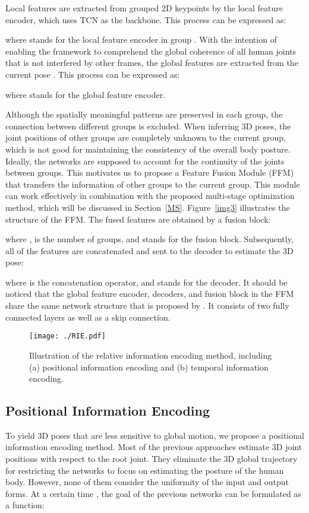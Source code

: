 \documentclass[sigconf]{acmart}
\begin{document}
Local features are extracted from grouped 2D keypoints by the local feature encoder, which uses TCN \cite{jllo20193d} as the backbone. This process can be expressed as:

where  stands for the local feature encoder in group . With the intention of enabling the framework to comprehend the global coherence of all human joints that is not interfered by other frames, the global features are extracted from the current pose . This process can be expressed as:

where  stands for the global feature encoder.

Although the spatially meaningful patterns are preserved in each group, the connection between different groups is excluded. When inferring 3D poses, the joint positions of other groups are completely unknown to the current group, which is not good for maintaining the consistency of the overall body posture. Ideally, the networks are supposed to account for the continuity of the joints between groups. This motivates us to propose a Feature Fusion Module (FFM) that transfers the information of other groups to the current group. This module can work effectively in combination with the proposed multi-stage optimization method, which will be discussed in Section~\ref{MS}. Figure~\ref{img3} illustrates the structure of the FFM. The fused features are obtained by a fusion block:

where ,  is the number of groups, and  stands for the fusion block. Subsequently, all of the features are concatenated and sent to the decoder to estimate the 3D pose:

where  is the concatenation operator, and  stands for the decoder. It should be noticed that the global feature encoder, decoders, and fusion block in the FFM share the same network structure that is proposed by \cite{martinez2017simple}. It consists of two fully connected layers as well as a skip connection. 


\begin{figure}
  \centering
  \texttt{[image: ./RIE.pdf]}
  \vspace{-0.4cm}
  \caption{Illustration of the relative information encoding method, including (a) positional information encoding and (b) temporal information encoding. }
  \vspace{-0.3cm}
  \label{img11}
\end{figure}

\subsection{Positional Information Encoding}\label{P-ENH}
To yield 3D poses that are less sensitive to global motion, we propose a positional information encoding method. Most of the previous approaches \cite{liu2020attention,martinez2017simple,jllo20193d} estimate 3D joint positions with respect to the root joint. They eliminate the 3D global trajectory for restricting the networks to focus on estimating the posture of the human body. However, none of them consider the uniformity of the input and output forms. At a certain time , the goal of the previous networks can be formulated as a function:
\end{document}
